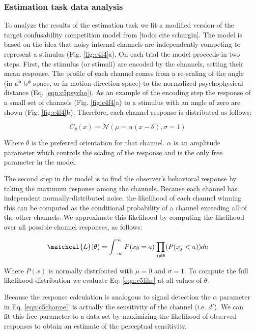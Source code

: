\subsubsection{Estimation task data analysis}

To analyze the results of the estimation task we fit a modified version of the target confusability competition model from [todo: cite schurgin]. The model is based on the idea that noisy internal channels are independently competing to represent a stimulus (Fig. \ref{fig:c4f4}a). On each trial the model proceeds in two steps. First, the stimulus (or stimuli) are encoded by the channels, setting their mean response. The profile of each channel comes from a re-scaling of the angle (in a* b* space, or in motion direction space) to the normalized psychophysical distance (Eq. \ref{eqn:c5psycho}). As an example of the encoding step the response of a small set of channels (Fig. \ref{fig:c4f4}a) to a stimulus with an angle of zero are shown (Fig. \ref{fig:c4f4}b). Therefore, each channel response is distributed as follows:

\begin{equation}
    C_{\theta}(x) = \mathcal{N}(\mu = \alpha(x-\theta),\sigma=1)
    \label{eqn:c5channel}
\end{equation}

Where $\theta$ is the preferred orientation for that channel. $\alpha$ is an amplitude parameter which controls the scaling of the response and is the only free parameter in the model.

The second step in the model is to find the observer's behavioral response by taking the maximum response among the channels. Because each channel has independent normally-distributed noise, the likelihood of each channel winning this can be computed as the conditional probability of a channel exceeding all of the other channels. We approximate this likelihood by computing the likelihood over all possible channel responses, as follows:

\begin{equation}
    \matchcal{L}(\theta) = \int_{-\infty}^{\infty} P(x_{\theta}=a) \prod_{j\neq \theta}(P(x_j < a)) da
    \label{eqn:c5like}
\end{equation}

Where $P(x)$ is normally distributed with $\mu=0$ and $\sigma=1$. To compute the full likelihood distribution we evaluate Eq. \ref{eqn:c5like} at all values of $\theta$.

Because the response calculation is analogous to signal detection the $\alpha$ parameter in Eq. \ref{eqn:c5channel} is actually the sensitivity of the channel (i.e. $d'$). We can fit this free parameter to a data set by maximizing the likelihood of observed responses to obtain an estimate of the perceptual sensitivity.

